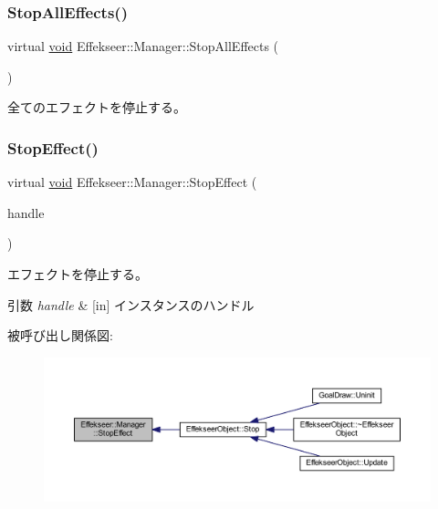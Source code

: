 \subsubsection{\texorpdfstring{Stop\+All\+Effects()}{StopAllEffects()}}
{\footnotesize\ttfamily virtual \mbox{\hyperlink{namespace_effekseer_ab34c4088e512200cf4c2716f168deb56}{void}} Effekseer\+::\+Manager\+::\+Stop\+All\+Effects (\begin{DoxyParamCaption}{ }\end{DoxyParamCaption})\hspace{0.3cm}{\ttfamily [pure virtual]}}



全てのエフェクトを停止する。 

\mbox{\label{class_effekseer_1_1_manager_a7a4a9ff929146f8ea21aa4705b352baa}} 
\subsubsection{\texorpdfstring{Stop\+Effect()}{StopEffect()}}
{\footnotesize\ttfamily virtual \mbox{\hyperlink{namespace_effekseer_ab34c4088e512200cf4c2716f168deb56}{void}} Effekseer\+::\+Manager\+::\+Stop\+Effect (\begin{DoxyParamCaption}\item[{\mbox{\hyperlink{namespace_effekseer_afba58b8d812da862190e9bbfc040824a}{Handle}}}]{handle }\end{DoxyParamCaption})\hspace{0.3cm}{\ttfamily [pure virtual]}}



エフェクトを停止する。 


\begin{DoxyParams}{引数}
{\em handle} & \mbox{[}in\mbox{]} インスタンスのハンドル \\
\hline
\end{DoxyParams}
被呼び出し関係図\+:\nopagebreak
\begin{figure}[H]
\begin{center}
\leavevmode
\includegraphics[width=350pt]{class_effekseer_1_1_manager_a7a4a9ff929146f8ea21aa4705b352baa_icgraph}
\end{center}
\end{figure}
\mbox{\label{class_effekseer_1_1_manager_adbde475d5977ca36c0a3a4c1e6878b33}} 
